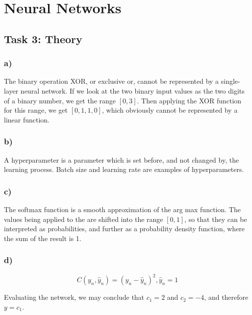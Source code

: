 \section{Neural Networks}
\subsection{Task 3: Theory}

\subsubsection*{a)}
The binary operation XOR, or exclusive or, cannot be represented by a single-layer neural network. If we look at the two binary input values as the two digits of a binary number, we get the range $[0, 3]$. Then applying the XOR function for this range, we get $[0, 1, 1, 0]$, which obviously cannot be represented by a linear function. 

\subsubsection*{b)}
A hyperparameter is a parameter which is set before, and not changed by, the learning process. Batch size and learning rate are examples of hyperparameters. 

\subsubsection*{c)}
The softmax function is a smooth approximation of the arg max function. The values being applied to the are shifted into the range $[0, 1]$, so that they can be interpreted as probabilities, and further as a probability density function, where the sum of the result is 1. 

\subsubsection*{d)}
\begin{equation}
    \label{eq:cost_function}
    C(y_n, \hat{y}_n) = (y_n - \hat{y}_n)^2, \hat{y}_n = 1
\end{equation}

Evaluating the network, we may conclude that $c_1 = 2$ and $c_2 = -4$, and therefore $y = c_1$. 

